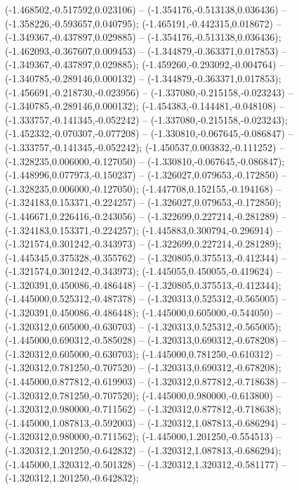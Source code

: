  (-1.468502,-0.517592,0.023106) -- (-1.354176,-0.513138,0.036436) -- (-1.358226,-0.593657,0.040795);
 (-1.465191,-0.442315,0.018672) -- (-1.349367,-0.437897,0.029885) -- (-1.354176,-0.513138,0.036436);
 (-1.462093,-0.367607,0.009453) -- (-1.344879,-0.363371,0.017853) -- (-1.349367,-0.437897,0.029885);
 (-1.459260,-0.293092,-0.004764) -- (-1.340785,-0.289146,0.000132) -- (-1.344879,-0.363371,0.017853);
 (-1.456691,-0.218730,-0.023956) -- (-1.337080,-0.215158,-0.023243) -- (-1.340785,-0.289146,0.000132);
 (-1.454383,-0.144481,-0.048108) -- (-1.333757,-0.141345,-0.052242) -- (-1.337080,-0.215158,-0.023243);
 (-1.452332,-0.070307,-0.077208) -- (-1.330810,-0.067645,-0.086847) -- (-1.333757,-0.141345,-0.052242);
 (-1.450537,0.003832,-0.111252) -- (-1.328235,0.006000,-0.127050) -- (-1.330810,-0.067645,-0.086847);
 (-1.448996,0.077973,-0.150237) -- (-1.326027,0.079653,-0.172850) -- (-1.328235,0.006000,-0.127050);
 (-1.447708,0.152155,-0.194168) -- (-1.324183,0.153371,-0.224257) -- (-1.326027,0.079653,-0.172850);
 (-1.446671,0.226416,-0.243056) -- (-1.322699,0.227214,-0.281289) -- (-1.324183,0.153371,-0.224257);
 (-1.445883,0.300794,-0.296914) -- (-1.321574,0.301242,-0.343973) -- (-1.322699,0.227214,-0.281289);
 (-1.445345,0.375328,-0.355762) -- (-1.320805,0.375513,-0.412344) -- (-1.321574,0.301242,-0.343973);
 (-1.445055,0.450055,-0.419624) -- (-1.320391,0.450086,-0.486448) -- (-1.320805,0.375513,-0.412344);
 (-1.445000,0.525312,-0.487378) -- (-1.320313,0.525312,-0.565005) -- (-1.320391,0.450086,-0.486448);
 (-1.445000,0.605000,-0.544050) -- (-1.320312,0.605000,-0.630703) -- (-1.320313,0.525312,-0.565005);
 (-1.445000,0.690312,-0.585028) -- (-1.320313,0.690312,-0.678208) -- (-1.320312,0.605000,-0.630703);
 (-1.445000,0.781250,-0.610312) -- (-1.320312,0.781250,-0.707520) -- (-1.320313,0.690312,-0.678208);
 (-1.445000,0.877812,-0.619903) -- (-1.320312,0.877812,-0.718638) -- (-1.320312,0.781250,-0.707520);
 (-1.445000,0.980000,-0.613800) -- (-1.320312,0.980000,-0.711562) -- (-1.320312,0.877812,-0.718638);
 (-1.445000,1.087813,-0.592003) -- (-1.320312,1.087813,-0.686294) -- (-1.320312,0.980000,-0.711562);
 (-1.445000,1.201250,-0.554513) -- (-1.320312,1.201250,-0.642832) -- (-1.320312,1.087813,-0.686294);
 (-1.445000,1.320312,-0.501328) -- (-1.320312,1.320312,-0.581177) -- (-1.320312,1.201250,-0.642832);
